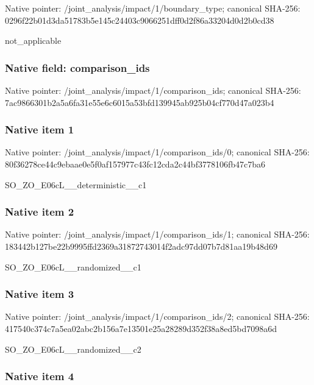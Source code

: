 \documentclass[10pt,a4paper]{article}
\begin{document}
Native pointer: /joint\_analysis/impact/1/boundary\_type; canonical SHA-256: 0296f22b01d3da51783b5e14\allowbreak{}5c24403c9066251dff0d2f86\allowbreak{}a33204d0d2b0cd38


not\_applicable


\subsubsection{Native field: comparison\_ids}


Native pointer: /joint\_analysis/impact/1/comparison\_ids; canonical SHA-256: 7ac9866301b2a5a6fa31e55e\allowbreak{}6c6015a53bfd139945ab925b\allowbreak{}04cf770d47a023b4



\subsubsection{Native item 1}


Native pointer: /joint\_analysis/impact/1\allowbreak{}/comparison\_ids/0; canonical SHA-256: 80f36278ce44c9ebaae0e5f0\allowbreak{}af157977c43fc12cda2c44bf\allowbreak{}3778106fb47c7ba6


SO\_ZO\_E06cL\_\_deterministic\_\_c1


\subsubsection{Native item 2}


Native pointer: /joint\_analysis/impact/1\allowbreak{}/comparison\_ids/1; canonical SHA-256: 183442b127be22b9995ffd23\allowbreak{}69a31872743014f2adc97dd0\allowbreak{}7b7d81aa19b48d69


SO\_ZO\_E06cL\_\_randomized\_\_c1


\subsubsection{Native item 3}


Native pointer: /joint\_analysis/impact/1\allowbreak{}/comparison\_ids/2; canonical SHA-256: 417540c374c7a5ea02abc2b1\allowbreak{}56a7e13501e25a28289d352f\allowbreak{}38a8ed5bd7098a6d


SO\_ZO\_E06cL\_\_randomized\_\_c2


\subsubsection{Native item 4}
\end{document}
